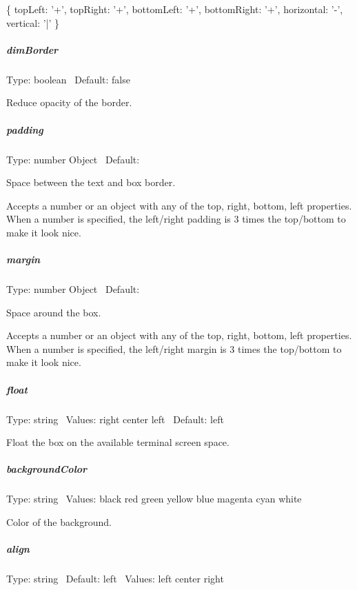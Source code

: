 \begin{DoxyCode}
\{
  topLeft: '+',
  topRight: '+',
  bottomLeft: '+',
  bottomRight: '+',
  horizontal: '-',
  vertical: '|'
\}
\end{DoxyCode}


\subparagraph*{dim\+Border}

Type\+: {\ttfamily boolean}~\newline
 Default\+: {\ttfamily false}

Reduce opacity of the border.

\subparagraph*{padding}

Type\+: {\ttfamily number} {\ttfamily Object}~\newline
 Default\+: {}

Space between the text and box border.

Accepts a number or an object with any of the {\ttfamily top}, {\ttfamily right}, {\ttfamily bottom}, {\ttfamily left} properties. When a number is specified, the left/right padding is 3 times the top/bottom to make it look nice.

\subparagraph*{margin}

Type\+: {\ttfamily number} {\ttfamily Object}~\newline
 Default\+: {}

Space around the box.

Accepts a number or an object with any of the {\ttfamily top}, {\ttfamily right}, {\ttfamily bottom}, {\ttfamily left} properties. When a number is specified, the left/right margin is 3 times the top/bottom to make it look nice.

\subparagraph*{float}

Type\+: {\ttfamily string}~\newline
 Values\+: {\ttfamily right} {\ttfamily center} {\ttfamily left}~\newline
 Default\+: {\ttfamily left}

Float the box on the available terminal screen space.

\subparagraph*{background\+Color}

Type\+: {\ttfamily string}~\newline
 Values\+: {\ttfamily black} {\ttfamily red} {\ttfamily green} {\ttfamily yellow} {\ttfamily blue} {\ttfamily magenta} {\ttfamily cyan} {\ttfamily white}

Color of the background.

\subparagraph*{align}

Type\+: {\ttfamily string}~\newline
 Default\+: {\ttfamily left}~\newline
 Values\+: {\ttfamily left} {\ttfamily center} {\ttfamily right}

